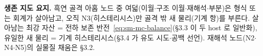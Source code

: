 \begin{keybox}
\textbf{생존 지도 요지.} 흑연 골격 아홉 노드 중 여덟(이월$\cdot$구조 이월$\cdot$재해석$\cdot$부분)은
형식 또는 회계가 살아남고, 오직 N3(히스테리시스)만 골격 밖 새 물리(기계 항)를 부른다. 살아남는 최강
자산 = 전하 보존 반전~\eqref{eq:sm-mc-balance}(§3.3 이 두 host 로 일반화), 유일한 새 물리 = 기계
히스테리시스(§3.4 가 유도 시도$\cdot$공백 선언). 재해석 노드(N2$\cdot$N4$\cdot$N5)의 실물질 채움은
§3.2.
\end{keybox}

